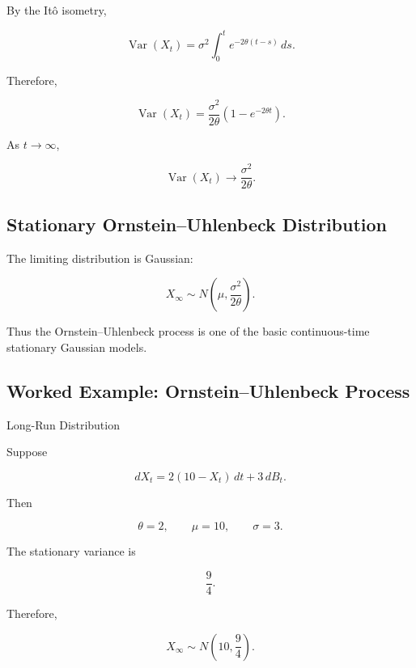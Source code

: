 By the It\^o isometry,

\[
\operatorname{Var}(X_t)
=
\sigma^2
\int_0^t
e^{-2\theta(t-s)}
\,ds.
\]

Therefore,

\[
\boxed{
\operatorname{Var}(X_t)
=
\frac{
\sigma^2
}{
2\theta
}
\left(
1-e^{-2\theta t}
\right).
}
\]

As \(t\to\infty\),

\[
\boxed{
\operatorname{Var}(X_t)
\to
\frac{\sigma^2}{2\theta}.
}
\]

\subsection{Stationary Ornstein--Uhlenbeck Distribution}
\label{subsec:ou-stationary-distribution}

The limiting distribution is Gaussian:

\[
\boxed{
X_\infty
\sim
N
\left(
\mu,
\frac{\sigma^2}{2\theta}
\right).
}
\]

Thus the Ornstein--Uhlenbeck process is one of the basic continuous-time
stationary Gaussian models.

\subsection{Worked Example: Ornstein--Uhlenbeck Process}
\label{subsec:worked-ou}

\begin{workedexamplebox}{Long-Run Distribution}

Suppose

\[
dX_t
=
2(10-X_t)\,dt
+
3\,dB_t.
\]

Then

\[
\theta=2,
\qquad
\mu=10,
\qquad
\sigma=3.
\]

The stationary variance is

\[
\frac{9}{4}.
\]

Therefore,

\begin{answerbox}
\[
\boxed{
X_\infty
\sim
N
\left(
10,
\frac94
\right).
}
\]
\end{answerbox}

\end{workedexamplebox}

